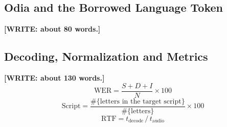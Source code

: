\documentclass[conference]{IEEEtran}
\newcommand{\WRITE}[1]{{\color{red}\textbf{[WRITE: #1]}}}
\begin{document}
\subsection{Odia and the Borrowed Language Token}

\WRITE{about 80 words.}

\subsection{Decoding, Normalization and Metrics}

\WRITE{about 130 words.}
\begin{equation}
\mathrm{WER} = \frac{S + D + I}{N} \times 100
\label{eq:wer}
\end{equation}
\begin{equation}
\mathrm{Script} = \frac{\#\{\text{letters in the target script}\}}{\#\{\text{letters}\}} \times 100
\label{eq:script}
\end{equation}
\begin{equation}
\mathrm{RTF} = t_{\mathrm{decode}} \,/\, t_{\mathrm{audio}}
\label{eq:rtf}
\end{equation}
\end{document}
